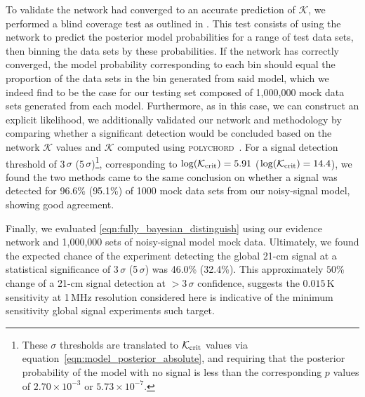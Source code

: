 \documentclass[twocolumn,english,aps,prd,amsmath,amssymb,reprint,floatfix,nofootinbib,showkeys]{revtex4-2}
\newcommand{\br}{\mathcal{K}}
\newif\ifhighlightchanges
\newcommand{\change}[1]{{\ifhighlightchanges\color{red} #1\else #1\fi}}
\begin{document}
\change{To validate the network had converged to an accurate prediction of $\br$, we performed a blind coverage test as outlined in \citet{EN}.
This test consists of using the network to predict the posterior model probabilities for a range of test data sets, then binning the data sets by these probabilities. 
If the network has correctly converged, the model probability corresponding to each bin should equal the proportion of the data sets in the bin generated from said model, which we indeed find to be the case for our testing set composed of \change{1,000,000} mock data sets generated from each model.}
\change{Furthermore, as in this case, we can construct an explicit likelihood, we additionally validated our network and methodology by comparing whether a significant detection would be concluded based on the network $\br$ values and $\br$ computed using \textsc{polychord}~\citep{POLYCHORD_I, POLYCHORD_II}.} 
For a signal detection threshold of 3\,$\sigma$ (5\,$\sigma$)\footnote{\change{These $\sigma$ thresholds are translated to $\br_{\rm crit}$ values via equation~\eqref{eqn:model_posterior_absolute}, and requiring that the posterior probability of the model with no signal is less than the corresponding $p$ values of $2.70\times10^{-3}$ or $5.73\times10^{-7}$.}}, corresponding to $\log(\br_{\rm crit}) = 5.91$ ($\log(\br_{\rm crit}) = 14.4$), we found the two methods came to the same conclusion \change{on whether a signal was detected} for \change{96.6}\% (\change{95.1}\%) of 1000 mock data sets from our noisy-signal model\change{, showing good agreement.}



Finally, we evaluated \cref{eqn:fully_bayesian_distinguish} using our evidence network and 1,000,000 sets of noisy-signal model mock data.
Ultimately, we found the expected chance of the experiment detecting the global 21-cm signal at a statistical significance of 3\,$\sigma$ (5\,$\sigma$) was \change{46.0}\% (\change{32.4}\%).
\change{This approximately $50$\% change of a 21-cm signal detection at $>3$\,$\sigma$ confidence}, suggests the $0.015$\,K sensitivity at 1\,MHz resolution considered here is indicative of the minimum sensitivity global signal experiments such target.
\end{document}
